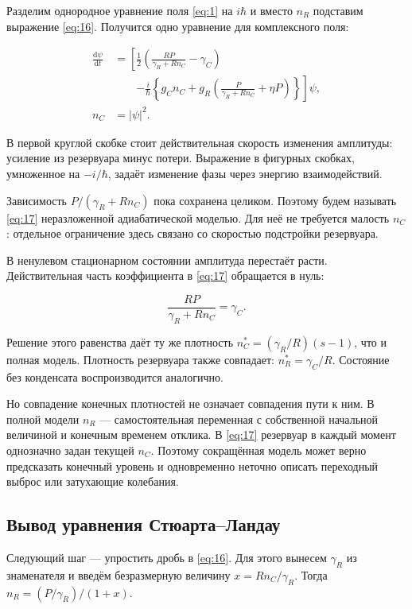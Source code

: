\documentclass[12pt,a4paper]{article}
\begin{document}
Разделим однородное уравнение поля \eqref{eq:1} на $i \hbar$ и вместо $n_{R}$ подставим выражение \eqref{eq:16}. Получится одно уравнение для комплексного поля:

\begin{equation}\label{eq:17}
\begin{aligned}
\frac{\mathrm d\psi}{\mathrm dt}
&=\left[\frac12\left(\frac{RP}{\gamma_R+Rn_C}-\gamma_C\right)\right.\\
&\qquad\left.-\frac{i}{\hbar}\left\{g_Cn_C+
g_R\left(\frac{P}{\gamma_R+Rn_C}+\eta P\right)\right\}\right]\psi,\\
n_C&=|\psi|^2 .
\end{aligned}\end{equation}

В первой круглой скобке стоит действительная скорость изменения амплитуды: усиление из резервуара минус потери. Выражение в фигурных скобках, умноженное на $-i/\hbar$, задаёт изменение фазы через энергию взаимодействий.

Зависимость $P/(\gamma_{R}+R n_{C})$ пока сохранена целиком. Поэтому будем называть \eqref{eq:17} неразложенной адиабатической моделью. Для неё не требуется малость $n_{C}$: отдельное ограничение здесь связано со скоростью подстройки резервуара.

В ненулевом стационарном состоянии амплитуда перестаёт расти. Действительная часть коэффициента в \eqref{eq:17} обращается в нуль:

\[
\frac{RP}{\gamma_R+Rn_C}=\gamma_C.
\]

Решение этого равенства даёт ту же плотность $n_{C}^{*}=(\gamma_{R}/R)(s-1)$, что и полная модель. Плотность резервуара также совпадает: $n_{R}^{*}=\gamma_{C}/R$. Состояние без конденсата воспроизводится аналогично.

Но совпадение конечных плотностей не означает совпадения пути к ним. В полной модели $n_{R}$ --- самостоятельная переменная с собственной начальной величиной и конечным временем отклика. В \eqref{eq:17} резервуар в каждый момент однозначно задан текущей $n_{C}$. Поэтому сокращённая модель может верно предсказать конечный уровень и одновременно неточно описать переходный выброс или затухающие колебания.

\subsection{Вывод уравнения Стюарта–Ландау}\label{sec:4.3}

Следующий шаг --- упростить дробь в \eqref{eq:16}. Для этого вынесем $\gamma_{R}$ из знаменателя и введём безразмерную величину $x=R n_{C}/\gamma_{R}$. Тогда $n_{R}=(P/\gamma_{R})/(1+x)$.
\end{document}
